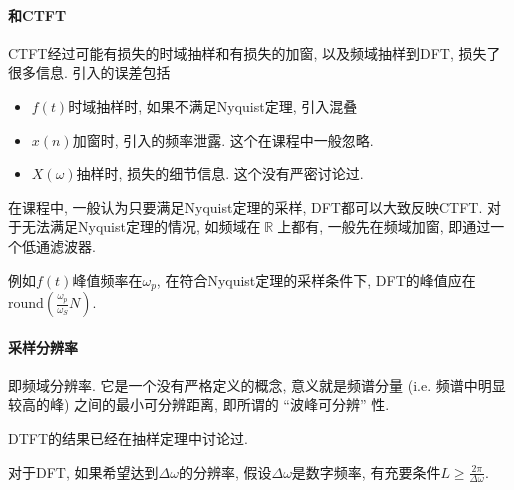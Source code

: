 \documentclass{ctexart}
\DeclareMathOperator{\Rset}{\mathbb{R}}
\begin{document}
\paragraph{和CTFT} CTFT经过可能有损失的时域抽样和有损失的加窗, 以及频域抽样到DFT,
    损失了很多信息. 引入的误差包括  \begin{itemize}
        \item $f(t)$时域抽样时, 如果不满足Nyquist定理, 引入混叠
        \item $x(n)$加窗时, 引入的频率泄露. 这个在课程中一般忽略.
        \item $X(\omega)$抽样时, 损失的细节信息. 这个没有严密讨论过.
    \end{itemize}
    在课程中, 一般认为只要满足Nyquist定理的采样, DFT都可以大致反映CTFT.
    对于无法满足Nyquist定理的情况, 如频域在$\Rset$上都有, 
    一般先在频域加窗, 即通过一个低通滤波器.\par
    例如$f(t)$峰值频率在$\omega_p$, 在符合Nyquist定理的采样条件下,
        DFT的峰值应在$\mathrm{round}\left(\frac{\omega_p}{\omega_S}N\right)$.\par
\paragraph{采样分辨率} 即频域分辨率. 它是一个没有严格定义的概念,
    意义就是频谱分量 (i.e. 频谱中明显较高的峰) 之间的最小可分辨距离,
    即所谓的 ``波峰可分辨'' 性.\par
    DTFT的结果已经在抽样定理中讨论过.\par
    对于DFT, 如果希望达到$\Delta \omega$的分辨率,
    假设$\Delta \omega$是数字频率, 有充要条件$L \ge \frac{2\pi}{\Delta \omega}$.
\end{document}

